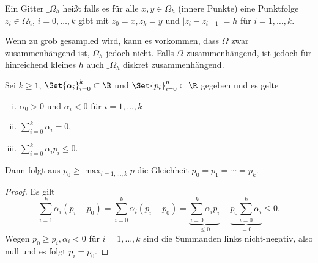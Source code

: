 \begin{df} \label{2.14}
	Ein Gitter $\_\Omega_h$ heißt  falls es für alle $x,y \in \Omega_h$ (innere Punkte) eine Punktfolge $z_i \in \Omega_h$, $i = 0, \dotsc, k$ gibt mit $z_0 = x, z_k = y$ und $|z_i - z_{i-1}| = h$ für $i = 1, \dotsc, k$.
	\begin{note}
		Wenn zu grob gesampled wird, kann es vorkommen, dass $\Omega$ zwar zusammenhängend ist, $\Omega_h$ jedoch nicht.
		Falls $\Omega$ zusammenhängend, ist jedoch für hinreichend kleines $h$ auch $\_\Omega_h$ diskret zusammenhängend.
	\end{note}
\end{df}

\begin{lem}[Sternlemma] \label{2.15}
	Sei $k \ge 1$, $\Set{\alpha_i}_{i=0}^k \subset \R$ und $\Set{p_i}_{i=0}^n \subset \R$ gegeben und es gelte
	\begin{enumerate}[i)]
		\item
			$\alpha_0 > 0$ und $\alpha_i < 0$ für $i = 1, \dotsc, k$
		\item
			$\sum_{i=0}^k \alpha_i = 0$,
		\item
			$\sum_{i=0}^k \alpha_i p_i \le 0$.
	\end{enumerate}
	Dann folgt aus $p_0 \ge \max_{i=1,\dotsc, k} p$ die Gleichheit $p_0 = p_1 = \dotsb = p_k$.
	\begin{proof}
		Es gilt
		\[
			\sum_{i=1}^k \alpha_i(p_i-p_0)
			= \sum_{i=0}^k \alpha_i (p_i-p_0)
			= \underbrace{\sum_{i=0}^k \alpha_i p_i}_{\le 0} - \underbrace{p_0 \sum_{i=0}^k \alpha_i}_{=0}
			\le 0.
		\]
		Wegen $p_0 \ge p_i, \alpha_i < 0$ für $i = 1, \dotsc, k$ sind die Summanden links nicht-negativ, also null und es folgt $p_i = p_0$.
	\end{proof}
\end{lem}

